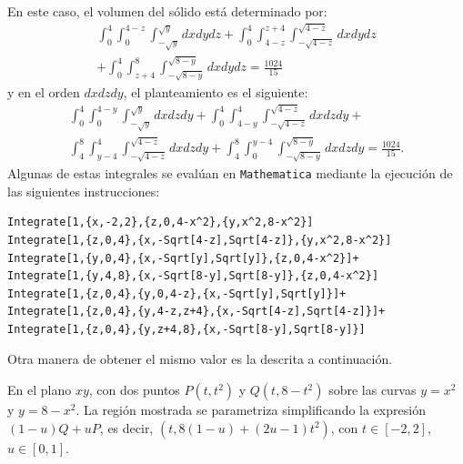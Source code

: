 En este caso, el volumen del sólido está determinado por:
\begin{multline*}
\int_{0}^{4}\int_{0}^{4-z}\int_{-\sqrt{y}}^{\sqrt{y}}dxdydz+
\int_{0}^{4}\int_{4-z}^{z+4}\int_{-\sqrt{4-z}}^{\sqrt{4-z}}dxdydz\\
+\int_{0}^{4}\int_{z+4}^{8}\int_{-\sqrt{8-y}}^{\sqrt{8-y}}dxdydz= \frac{1024}{15}
\end{multline*}
y en el orden $dxdzdy$, el planteamiento es el siguiente:
\begin{multline*}
\int_{0}^{4}\int_{0}^{4-y}\int_{-\sqrt{y}}^{\sqrt{y}}dxdzdy+
\int_{0}^{4}\int_{4-y}^{4}\int_{-\sqrt{4-z}}^{\sqrt{4-z}}dxdzdy+ \\
\int_{4}^{8}\int_{y-4}^{4}\int_{-\sqrt{4-z}}^{\sqrt{4-z}}dxdzdy+\int_{4}^{8}%
\int_{0}^{y-4}\int_{-\sqrt{8-y}}^{\sqrt{8-y}}dxdzdy=\frac{1024}{15}.
\end{multline*}
Algunas de estas integrales se evalúan en \verb"Mathematica" mediante la ejecución de las siguientes instrucciones:

\begin{tcolorbox}[title=\bf Instrucción en \verb"Mathematica"]\begin{Verbatim}[formatcom=\letraverbatim]
Integrate[1,{x,-2,2},{z,0,4-x^2},{y,x^2,8-x^2}]
Integrate[1,{z,0,4},{x,-Sqrt[4-z],Sqrt[4-z]},{y,x^2,8-x^2}]
Integrate[1,{y,0,4},{x,-Sqrt[y],Sqrt[y]},{z,0,4-x^2}]+
Integrate[1,{y,4,8},{x,-Sqrt[8-y],Sqrt[8-y]},{z,0,4-x^2}]
Integrate[1,{z,0,4},{y,0,4-z},{x,-Sqrt[y],Sqrt[y]}]+
Integrate[1,{z,0,4},{y,4-z,z+4},{x,-Sqrt[4-z],Sqrt[4-z]}]+
Integrate[1,{z,0,4},{y,z+4,8},{x,-Sqrt[8-y],Sqrt[8-y]}]
\end{Verbatim}
\end{tcolorbox}


Otra manera de obtener el mismo valor es la descrita a continuación.


En el plano $xy$, con dos puntos $P(t,t^2)$ y $Q(t,8-t^2)$
sobre las curvas $y=x^2$ y $y=8-x^2$.
La región mostrada se parametriza simplificando la expresión $(1-u)Q+uP$, es decir,
$(t,8(1-u)+(2u-1)t^2)$, con $t \in [-2,2]$, $u \in [0,1]$.

